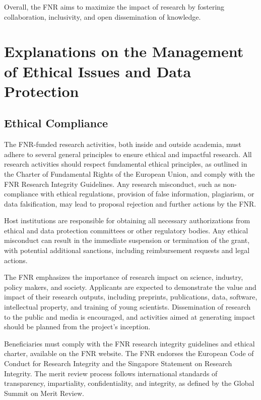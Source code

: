 \documentclass{article}
\begin{document}
Overall, the FNR aims to maximize the impact of research by fostering collaboration, inclusivity, and open dissemination of knowledge.

\section{Explanations on the Management of Ethical Issues and Data Protection}

\subsection{Ethical Compliance}

The FNR-funded research activities, both inside and outside academia, must adhere to several general principles to ensure ethical and impactful research. All research activities should respect fundamental ethical principles, as outlined in the Charter of Fundamental Rights of the European Union, and comply with the FNR Research Integrity Guidelines. Any research misconduct, such as non-compliance with ethical regulations, provision of false information, plagiarism, or data falsification, may lead to proposal rejection and further actions by the FNR.

Host institutions are responsible for obtaining all necessary authorizations from ethical and data protection committees or other regulatory bodies. Any ethical misconduct can result in the immediate suspension or termination of the grant, with potential additional sanctions, including reimbursement requests and legal actions.

The FNR emphasizes the importance of research impact on science, industry, policy makers, and society. Applicants are expected to demonstrate the value and impact of their research outputs, including preprints, publications, data, software, intellectual property, and training of young scientists. Dissemination of research to the public and media is encouraged, and activities aimed at generating impact should be planned from the project's inception.

Beneficiaries must comply with the FNR research integrity guidelines and ethical charter, available on the FNR website. The FNR endorses the European Code of Conduct for Research Integrity and the Singapore Statement on Research Integrity. The merit review process follows international standards of transparency, impartiality, confidentiality, and integrity, as defined by the Global Summit on Merit Review.
\end{document}
